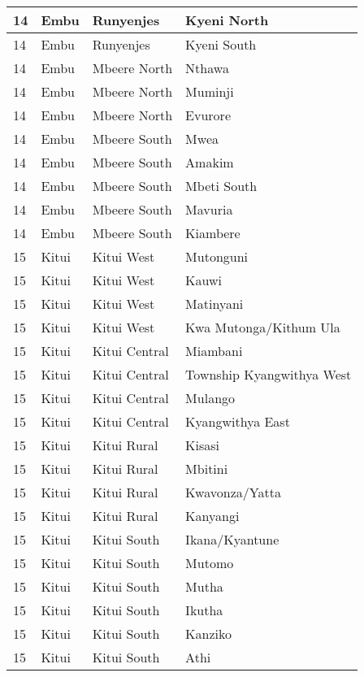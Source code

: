 \begin{table}[!ht]
\begin{tabular}{|l|l|l|l|}
        14 & Embu & Runyenjes & Kyeni North \\ \hline
        14 & Embu & Runyenjes & Kyeni South \\ \hline
        14 & Embu & Mbeere North & Nthawa \\ \hline
        14 & Embu & Mbeere North & Muminji \\ \hline
        14 & Embu & Mbeere North & Evurore \\ \hline
        14 & Embu & Mbeere South & Mwea \\ \hline
        14 & Embu & Mbeere South & Amakim \\ \hline
        14 & Embu & Mbeere South & Mbeti South \\ \hline
        14 & Embu & Mbeere South & Mavuria \\ \hline
        14 & Embu & Mbeere South & Kiambere \\ \hline
        15 & Kitui & Kitui West & Mutonguni \\ \hline
        15 & Kitui & Kitui West & Kauwi \\ \hline
        15 & Kitui & Kitui West & Matinyani \\ \hline
        15 & Kitui & Kitui West & Kwa Mutonga/Kithum Ula \\ \hline
        15 & Kitui & Kitui Central & Miambani \\ \hline
        15 & Kitui & Kitui Central & Township Kyangwithya West \\ \hline
        15 & Kitui & Kitui Central & Mulango \\ \hline
        15 & Kitui & Kitui Central & Kyangwithya East \\ \hline
        15 & Kitui & Kitui Rural & Kisasi \\ \hline
        15 & Kitui & Kitui Rural & Mbitini \\ \hline
        15 & Kitui & Kitui Rural & Kwavonza/Yatta \\ \hline
        15 & Kitui & Kitui Rural & Kanyangi \\ \hline
        15 & Kitui & Kitui South & Ikana/Kyantune \\ \hline
        15 & Kitui & Kitui South & Mutomo \\ \hline
        15 & Kitui & Kitui South & Mutha \\ \hline
        15 & Kitui & Kitui South & Ikutha \\ \hline
        15 & Kitui & Kitui South & Kanziko \\ \hline
        15 & Kitui & Kitui South & Athi \\ \hline

\end{tabular}
\end{table}
